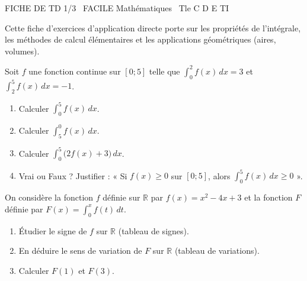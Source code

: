 \documentclass[11pt]{article}
\begin{document}
\begin{tcolorbox}[enhanced,colback=popink,colframe=popink,arc=10pt,boxrule=0pt,left=12pt,right=12pt,top=9pt,bottom=9pt]
{\color{white}\popxbold\small FICHE DE TD 1/3 \textbullet\ FACILE \hfill Mathématiques \textbullet\ Tle C D E TI\par}
\end{tcolorbox}
\vspace{4pt}
\noindent Cette fiche d'exercices d'application directe porte sur les propriétés de l'intégrale, les méthodes de calcul élémentaires et les applications géométriques (aires, volumes).\\

\begin{exercice}
Soit $f$ une fonction continue sur $[0; 5]$ telle que $\int_{0}^{2} f(x)\,dx = 3$ et $\int_{2}^{5} f(x)\,dx = -1$.
\begin{enumerate}
    \item Calculer $\int_{0}^{5} f(x)\,dx$.
    \item Calculer $\int_{5}^{0} f(x)\,dx$.
    \item Calculer $\int_{0}^{5} \bigl(2f(x) + 3\bigr)\,dx$.
    \item Vrai ou Faux ? Justifier : « Si $f(x) \geq 0$ sur $[0;5]$, alors $\int_{0}^{5} f(x)\,dx \geq 0$ ».
\end{enumerate}
\end{exercice}

\begin{exercice}
On considère la fonction $f$ définie sur $\mathbb{R}$ par $f(x) = x^2 - 4x + 3$ et la fonction $F$ définie par $F(x) = \int_{0}^{x} f(t)\,dt$.
\begin{enumerate}
    \item Étudier le signe de $f$ sur $\mathbb{R}$ (tableau de signes).
    \item En déduire le sens de variation de $F$ sur $\mathbb{R}$ (tableau de variations).
    \item Calculer $F(1)$ et $F(3)$.
\end{enumerate}
\end{exercice}
\end{document}
